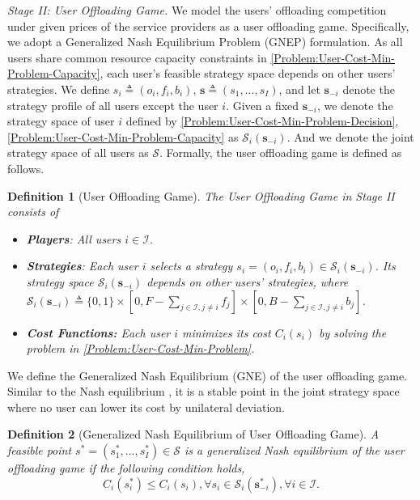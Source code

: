 \documentclass[lettersize,journal]{IEEEtran}
\newtheorem{definition}{Definition}
\begin{document}
\emph{Stage II: User Offloading Game.}  
We model the users' offloading competition under given prices of the service providers as a user offloading game. 
Specifically, we adopt a Generalized Nash Equilibrium Problem (GNEP) \cite{arrow1954existence,facchinei2010generalized} formulation.
As all users share common resource capacity constraints in \eqref{Problem:User-Cost-Min-Problem-Capacity}, each user's feasible strategy space depends on other users' strategies. 
We define $s_i\triangleq(o_i,f_i,b_i)$, $\boldsymbol{s}\triangleq(s_1,...,s_I)$, and let $\boldsymbol{s}_{-i}$ denote the strategy profile of all users except the user $i$. Given a fixed $\boldsymbol{s}_{-i}$, we denote the strategy space of user $i$ defined by \eqref{Problem:User-Cost-Min-Problem-Decision}, \eqref{Problem:User-Cost-Min-Problem-Capacity} as $\mathcal{S}_i(\boldsymbol{s}_{-i})$. And we denote the joint strategy space of all users as $\mathcal{S}$.
Formally, the user offloading game is defined as follows.
\begin{definition}[User Offloading Game]
    The User Offloading Game in Stage II consists of
    \begin{itemize}
        \item \textbf{Players}: All users \( i \in \mathcal{I} \).
        \item \textbf{Strategies}: Each user \( i \) selects a strategy \( s_i = (o_i, f_i, b_i)\in \mathcal{S}_i(\boldsymbol{s}_{-i}) \). Its strategy space $\mathcal{S}_i(\boldsymbol{s}_{-i})$ depends on other users' strategies, where $\mathcal{S}_i(\boldsymbol{s}_{-i})\triangleq \{0,1\}\times[0,F-\sum_{j\in\mathcal{I},j\neq i} f_j]\times[0,B-\sum_{j\in\mathcal{I},j\neq i} b_j]$.
        \item \textbf{Cost Functions:} Each user \( i \) minimizes its cost \( C_i(s_i) \) by solving the problem in \eqref{Problem:User-Cost-Min-Problem}.
    \end{itemize}
\end{definition}

 We define the Generalized Nash Equilibrium (GNE) \cite{facchinei2010generalized,sagratella2017algorithms,zaw2023radio} of the user offloading game. Similar to the Nash equilibrium \cite{nash2024non,chen2015efficient}, it is a stable point in the joint strategy space where no user can lower its cost by unilateral deviation.
\begin{definition}[Generalized Nash Equilibrium of User Offloading Game]\label{Definition:User-Nash-Equilibrium}
    A feasible point $s^*=(s^*_1,...,s^*_I)\in\mathcal{S}$ is a generalized Nash equilibrium of the user offloading game if the following condition holds,
    \begin{equation}
        C_i(s^*_i)\le C_i(s_i),\forall s_i\in \mathcal{S}_i(\boldsymbol{s}^*_{-i}), \forall i\in\mathcal{I}.
    \end{equation}
\end{definition}
\end{document}
